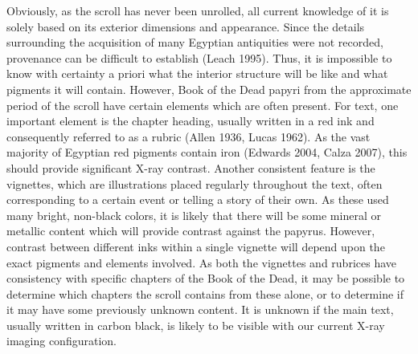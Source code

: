 \documentclass[12pt]{article}
\begin{document}
Obviously, as the scroll has never been unrolled, all current knowledge of it is solely based on its exterior dimensions and appearance. Since the details surrounding the acquisition of many Egyptian antiquities were not recorded, provenance can be difficult to establish (Leach 1995). Thus, it is impossible to know with certainty a priori what the interior structure will be like and what pigments it will contain. However, Book of the Dead papyri from the approximate period of the scroll have certain elements which are often present. For text, one important element is the chapter heading, usually written in a red ink and consequently referred to as a rubric (Allen 1936, Lucas 1962). As the vast majority of Egyptian red pigments contain iron (Edwards 2004, Calza 2007), this should provide significant X-ray contrast. Another consistent feature is the vignettes, which are illustrations placed regularly throughout the text, often corresponding to a certain event or telling a story of their own. As these used many bright, non-black colors, it is likely that there will be some mineral or metallic content which will provide contrast against the papyrus. However, contrast between different inks within a single vignette will depend upon the exact pigments and elements involved. As both the vignettes and rubrices have consistency with specific chapters of the Book of the Dead, it may be possible to determine which chapters the scroll contains from these alone, or to determine if it may have some previously unknown content. It is unknown if the main text, usually written in carbon black, is likely to be visible with our current X-ray imaging configuration.

\section*{}



\end{document}
